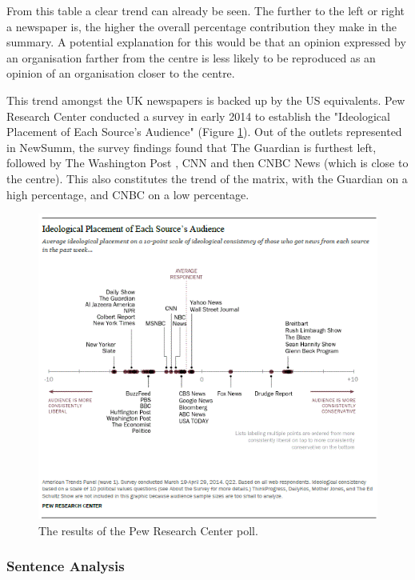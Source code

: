 \documentclass[12pt]{article}
\begin{document}
From this table a clear trend can already be seen. The further to the left or right a newspaper is, the higher the overall percentage contribution they make in the summary. A potential explanation for this would be that an opinion expressed by an organisation farther from the centre is less likely to be reproduced as an opinion of an organisation closer to the centre. 

This trend amongst the UK newspapers is backed up by the US equivalents. Pew Research Center \cite{pewresearch} conducted a survey in early 2014 to establish the "Ideological Placement of Each Source's Audience" \cite{pewarticle} (Figure \ref{pewresearch}). Out of the outlets represented in NewSumm, the survey findings found that The Guardian is furthest left, followed by The Washington Post \cite{washingtonpost}, CNN \cite{cnn} and then CNBC News \cite{cnbc} (which is close to the centre). This also constitutes the trend of the matrix, with the Guardian on a high percentage, and CNBC on a low percentage.

\begin{figure}[ht!]
  \centering
    \includegraphics[scale=0.6]{pewresearch.png}
   \caption[A graph depicting responses to the User Interface Survey]{The results of the Pew Research Center poll.}
   \label{pewresearch}
\end{figure}

\subsubsection{Sentence Analysis}
\end{document}
